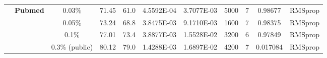 \begin{table}[htbp]
\begin{tabular}{ccccc|cccccc}
          & \multirow{4}[1]{*}{\textbf{Pubmed}} & 0.03\% & 71.45 & 61.0  & 4.5592E-04 & 3.7077E-03 & 5000  & 7     & 0.98677 & RMSprop \\
          &       & 0.05\% & 73.24 & 68.8  & 3.8475E-03 & 9.1710E-03 & 1600  & 7     & 0.98375 & RMSprop \\
          &       & 0.1\% & 77.01 & 73.4  & 3.8877E-03 & 1.5528E-02 & 3200  & 6     & 0.97849 & RMSprop \\
          &       & 0.3\% (public) & 80.12 & 79.0  & 1.4288E-03 & 1.6897E-02 & 4200  & 7     & 0.017084 & RMSprop \\
    \bottomrule
    \bottomrule
    \end{tabular}%
  \label{tab:hyperparameters_with_validation}%
\end{table}%
